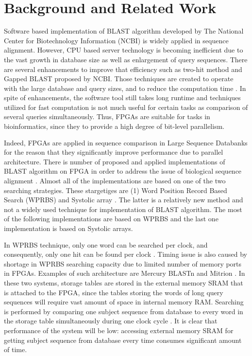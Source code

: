 \section{Background and Related Work}
\label{sec:background}


\quad Software based implementation of BLAST algorithm developed by The National Center for Biotechnology Information (NCBI) \cite{ncbiBlast} is widely applied in sequence alignment. However, CPU based server technology is becoming inefficient due to the vast growth in database size as well as enlargement of query sequences. There are several enhancements to improve that efficiency such as two-hit method and Gapped BLAST proposed by NCBI. Those techniques are created to operate with the large database and query sizes, and to reduce the computation time \cite{WIENBRANDT20111967}. In spite of enhancements, the software tool still takes long runtime and techniques utilized for fast computation is not much useful for certain tasks as comparison of several queries simultaneously. Thus, FPGAs are suitable for tasks in bioinformatics, since they to provide a high degree of bit-level parallelism.

Indeed, FPGAs are applied in sequence comparison in Large Sequence Databanks for the reason that they significantly improve performance due to parallel architecture. There is number of proposed and applied implementations of BLAST algorithm on FPGA in order to address the issue of biological sequence alignment \cite{oliver2005hyper}. Almost all of the implementations are based on one of the two searching strategies. These stargetiges are (1) Word Position Record Based Search (WPRBS) and Systolic array \cite{guo2012systolic}. The latter is a relatively new method and not a widely used technique for implementation of BLAST algorithm. The most of the following implementations are based on WPRBS and the last one implementation is based on Systolic arrays.

In WPRBS technique, only one word can be searched per clock, and consequently, only one hit can be found per clock \cite{guo2012open}. Timing issue is also caused by shortage in WPRBS searching capacity due to limited number of memory ports in FPGAs. Examples of such architecture are Mercury BLASTn \cite{buhler2007mercury} and Mitrion \cite{guo2012systolic}. In these two systems, storage tables are stored in the external memory SRAM that is attached to the FPGA, since the tables storing the words of long query sequences will require vast amount of space in internal memory RAM. Searching is performed by comparing one subject sequence from database to every word in the storage table simultaneously during one clock cycle \cite{guo2012systolic}. It is clear that performance of the system will be low: accessing external memory SRAM for getting subject sequence from database every time consumes significant amount of time. 

